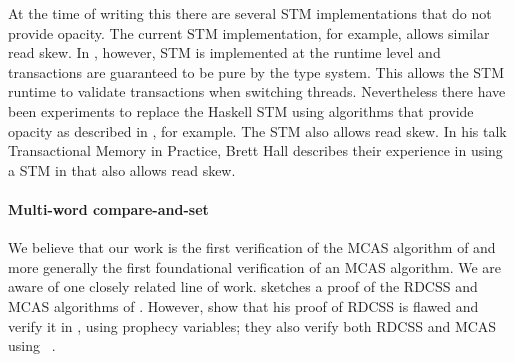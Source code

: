 At the time of writing this there are several STM implementations that do not provide opacity.
The current \Haskell STM implementation, for example, allows similar read skew.
In \Haskell, however, STM is implemented at the runtime level and transactions are guaranteed to be pure by the type system.
This allows the \Haskell STM runtime to validate transactions when switching threads.
Nevertheless there have been experiments to replace the Haskell STM using algorithms that provide opacity as described in \citet{DBLP:conf/haskell/LeYF16}, for example.
The \Scala \ZIO STM also allows read skew.
In his talk Transactional Memory in Practice, Brett Hall describes their experience in using a STM in \Cpp that also allows read skew.


\paragraph{Multi-word compare-and-set}

We believe that our work is the first verification of the MCAS algorithm of \citet{DBLP:conf/wdag/GuerraouiKMZ20} and more generally the first foundational verification of an MCAS algorithm.
We are aware of one closely related line of work.
 sketches a proof of the RDCSS and MCAS algorithms of \citet{DBLP:conf/wdag/HarrisFP02}.
However, \citet{DBLP:journals/pacmpl/JungLPRTDJ20} show that his proof of RDCSS is flawed and verify it in \Iris, using prophecy variables; they also verify both RDCSS and MCAS using \VeriFast~\citep{DBLP:conf/nfm/JacobsSPVPP11}.
